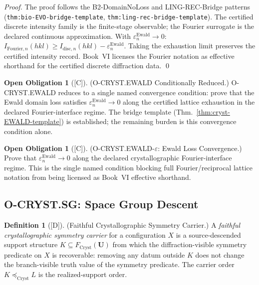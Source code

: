 \documentclass[12pt,oneside]{amsbook}
\theoremstyle{plain}
\theoremstyle{definition}
\newtheorem{definition}[theorem]{Definition}
\newtheorem{obligation}[theorem]{Open Obligation}
\theoremstyle{remark}
\newcommand{\status}[1]{\textup{[#1]}}
\begin{document}
\begin{proof}
The proof follows the B2-DomainNoLoss and LING-REC-Bridge
patterns (\texttt{thm:bio-EVO-bridge-template},
\texttt{thm:ling-rec-bridge-template}).  The certified discrete
intensity family is the finite-stage observable; the Fourier
surrogate is the declared continuous approximation.  With
$\varepsilon^{\mathrm{Ewald}}_n \to 0$:
$I_{\mathrm{Fourier},n}(hkl) \ge I_{\mathrm{disc},n}(hkl) -
\varepsilon^{\mathrm{Ewald}}_n$.
Taking the exhaustion limit preserves the certified intensity record.
Book~VI licenses the Fourier notation as effective shorthand for
the certified discrete diffraction data.
\qed
\end{proof}

\begin{obligation}[\status{C}]\label{ob:cryst-EWALD-reduced}
\textup{(O-CRYST.EWALD Conditionally Reduced.)}
O-CRYST.EWALD reduces to a single named convergence condition:
prove that the Ewald domain loss satisfies
$\varepsilon^{\mathrm{Ewald}}_n \to 0$ along the certified lattice
exhaustion in the declared Fourier-interface regime.  The bridge
template (Thm.~\ref{thm:cryst-EWALD-template}) is established;
the remaining burden is this convergence condition alone.
\end{obligation}

\begin{obligation}[\status{C}]\label{ob:cryst-ewald-eps}
\textup{(O-CRYST.EWALD-$\varepsilon$: Ewald Loss Convergence.)}
Prove that $\varepsilon^{\mathrm{Ewald}}_n \to 0$ along the declared
crystallographic Fourier-interface regime.  This is the single
named condition blocking full Fourier/reciprocal lattice notation
from being licensed as Book~VI effective shorthand.
\end{obligation}

\subsection{O-CRYST.SG: Space Group Descent}
\label{sec:cryst-SG-discharge}

\begin{definition}[\status{D}]\label{def:cryst-faithful-symmetry-carrier}
\textup{(Faithful Crystallographic Symmetry Carrier.)}
A \emph{faithful crystallographic symmetry carrier} for a
configuration $X$ is a source-descended support structure
$K \subseteq F_{\mathrm{Cryst}}(\mathbf{U})$ from which the
diffraction-visible symmetry predicate on $X$ is recoverable:
removing any datum outside $K$ does not change the branch-visible
truth value of the symmetry predicate.  The carrier order
$K \preceq_{\mathrm{Cryst}} L$ is the realized-support order.
\end{definition}
\end{document}
